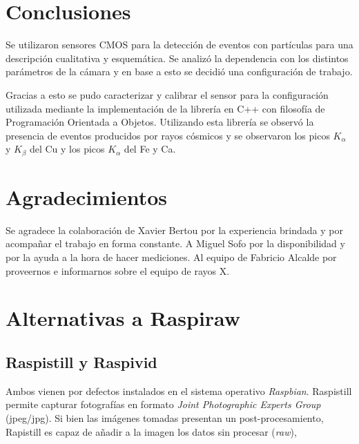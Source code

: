 \documentclass[twoside,twocolumn]{article}
\begin{document}

  \section{Conclusiones}
    Se utilizaron sensores CMOS para la detección de eventos con partículas para una descripción cualitativa y esquemática.
    Se analizó la dependencia con los distintos parámetros de la cámara y en base a esto se decidió una configuración de trabajo.

    Gracias a esto se pudo caracterizar y calibrar el sensor para la configuración utilizada mediante la implementación de la librería
    en C++ con filosofía de Programación Orientada a Objetos.
    Utilizando esta librería se observó la presencia de eventos producidos por rayos cósmicos y
    se observaron los picos $K_{\alpha}$ y $K_{\beta}$ del Cu y los picos $K_{\alpha}$ del Fe y Ca.

  
  

  \section*{Agradecimientos}
    Se agradece la colaboración de Xavier Bertou por la experiencia brindada y por
    acompañar el trabajo en forma constante.
    A Miguel Sofo por la disponibilidad y por la ayuda a la hora de hacer mediciones.
    Al equipo de Fabricio Alcalde por proveernos e informarnos sobre el equipo de rayos X.

  \clearpage
  \appendix
  \section{Alternativas a Raspiraw}\label{sec:ap_alternatives}
  
  \subsection{Raspistill y Raspivid}
    Ambos vienen por defectos instalados en el sistema operativo \emph{Raspbian}.
    Raspistill permite capturar fotografías en formato \emph{Joint Photographic Experts Group} (jpeg/jpg).
    Si bien las imágenes tomadas presentan un post-procesamiento, Rapistill es capaz de añadir a la imagen los datos sin procesar (\emph{raw}),
\end{document}
